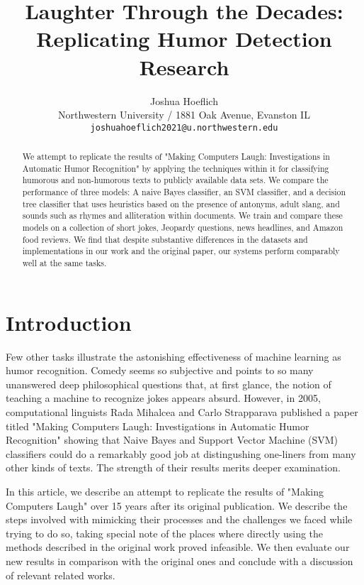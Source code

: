 \documentclass[11pt,a4paper]{article}
\title{Laughter Through the Decades: Replicating Humor Detection Research}
\author{Joshua Hoeflich \\
  Northwestern University / 1881 Oak Avenue, Evanston IL \\
  \texttt{joshuahoeflich2021@u.northwestern.edu} \\
  }
\date{}
\begin{document}
\maketitle
\begin{abstract}
  We attempt to replicate the results of "Making Computers Laugh: Investigations in Automatic Humor Recognition" by applying the techniques within it for classifying humorous and non-humorous texts to publicly available data sets. \cite{mihalcea2005making} We compare the performance of three models: A naive Bayes classifier, an SVM classifier, and a decision tree classifier that uses heuristics based on the presence of antonyms, adult slang, and sounds such as rhymes and alliteration within documents. We train and compare these models on a collection of short jokes, Jeopardy questions, news headlines, and Amazon food reviews. We find that despite substantive differences in the datasets and implementations in our work and the original paper, our systems perform comparably well at the same tasks.
\end{abstract}

\section{Introduction}
Few other tasks illustrate the astonishing effectiveness of machine learning as humor recognition. Comedy seems so subjective and points to so many unanswered deep philosophical questions that, at first glance, the notion of teaching a machine to recognize jokes appears absurd. However, in 2005, computational linguists Rada Mihalcea and Carlo Strapparava published a paper titled "Making Computers Laugh: Investigations in Automatic Humor Recognition" showing that Naive Bayes and Support Vector Machine (SVM) classifiers could do a remarkably good job at distingushing one-liners from many other kinds of texts. The strength of their results merits deeper examination.

In this article, we describe an attempt to replicate the results of "Making Computers Laugh" over 15 years after its original publication. We describe the steps involved with mimicking their processes and the challenges we faced while trying to do so, taking special note of the places where directly using the methods described in the original work proved infeasible. We then evaluate our new results in comparison with the original ones and conclude with a discussion of relevant related works.
\end{document}
